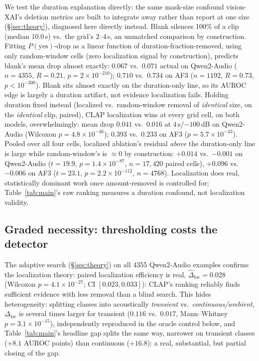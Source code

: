 \documentclass{article}
\begin{document}
We test the duration explanation directly: the same mask-size
confound vision-XAI's deletion metrics are built to integrate away
rather than report at one size \cite{petsiuk2018rise,fong2019extremal}
(\S\ref{sec:theory}), diagnosed here directly instead. Blank silences
100\% of a clip (median $10.0$\,s) vs.\ the grid's $2$--$4$\,s, an
unmatched comparison by construction. Fitting $P(\text{yes})$-drop as a linear
function of duration-fraction-removed, using only random-window cells
(zero localization signal by construction), predicts blank's mean drop
almost exactly: $0.067$ vs.\ $0.071$ actual on Qwen2-Audio ($n{=}4355$,
$R{=}0.21$, $p{=}2\times10^{-210}$); $0.710$ vs.\ $0.734$ on AF3
($n{=}1192$, $R{=}0.73$, $p{<}10^{-300}$). Blank sits almost exactly
on the duration-only line, so its AUROC edge is largely a duration
artifact, not evidence localization fails. Holding duration fixed
instead (localized vs.\ random-window removal of \emph{identical}
size, on the \emph{identical} clip, paired), CLAP localization wins at
every grid cell, on both models, overwhelmingly: mean drop $0.041$
vs.\ $0.016$ at $4$\,s/$-100$\,dB on Qwen2-Audio (Wilcoxon
$p{=}4.8\times10^{-46}$); $0.393$ vs.\ $0.233$ on AF3
($p{=}5.7\times10^{-43}$). Pooled over all four cells, localized
ablation's residual \emph{above} the duration-only line is large while
random-window's is $\approx\!0$ by construction: $+0.014$ vs.\
$-0.001$ on Qwen2-Audio ($t{=}19.9$, $p{=}1.4\times10^{-87}$,
$n{=}17{,}420$ paired cells), $+0.096$ vs.\ $-0.006$ on AF3
($t{=}23.1$, $p{=}2.2\times10^{-112}$, $n{=}4768$). Localization does
real, statistically dominant work once amount-removed is controlled
for; Table~\ref{tab:main}'s raw ranking measures a duration confound,
not localization validity.

\subsection{Graded necessity: thresholding costs the detector}\label{sec:gradedresults}

The adaptive search (\S\ref{sec:theory}) on all 4355 Qwen2-Audio
examples confirms the localization theory: paired localization
efficiency is real, $\widehat{\Delta}_{\text{loc}} = 0.028$ (Wilcoxon
$p{=}4.1\times10^{-27}$; CI $[0.023, 0.033]$): CLAP's ranking reliably
finds sufficient evidence with less removal than a blind search. This
hides heterogeneity: splitting classes into acoustically
\emph{transient} vs.\ \emph{continuous/ambient}, $\Delta_{\text{loc}}$
is several times larger for transient ($0.116$ vs.\ $0.017$,
Mann--Whitney $p{=}3.1\times10^{-15}$), independently reproduced in
the oracle control below, and Table~\ref{tab:main}'s headline gap
splits the same way, narrower on transient classes ($+8.1$ AUROC
points) than continuous ($+16.8$): a real, substantial, but partial
closing of the gap.
\end{document}
